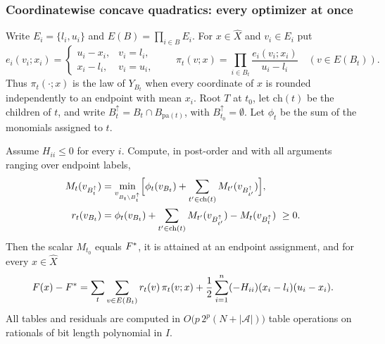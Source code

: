 \subsubsection{Coordinatewise concave quadratics: every optimizer at once}

Write $E_i=\{l_i,u_i\}$ and $E(B)=\prod_{i\in B}E_i$. For $x\in\hat X$ and
$v_i\in E_i$ put
\[
e_i(v_i;x_i)=\begin{cases}u_i-x_i,&v_i=l_i,\\ x_i-l_i,&v_i=u_i,\end{cases}
\qquad
\pi_t(v;x)=\prod_{i\in B_t}\frac{e_i(v_i;x_i)}{u_i-l_i}\quad(v\in E(B_t)).
\]
Thus $\pi_t(\cdot;x)$ is the law of $Y_{B_t}$ when every coordinate of $x$
is rounded independently to an endpoint with mean $x_i$. Root $T$ at $t_0$,
let $\mathrm{ch}(t)$ be the children of $t$, and write
$B_t^{\uparrow}=B_t\cap B_{\mathrm{pa}(t)}$, with $B_{t_0}^{\uparrow}=\emptyset$.
Let $\phi_t$ be the sum of the monomials assigned to $t$.

\begin{lemma}\label{lem:endpointid}
Assume $H_{ii}\le0$ for every $i$. Compute, in post-order and with all
arguments ranging over endpoint labels,
\begin{align*}
M_t(v_{B_t^\uparrow})&=\min_{v_{B_t\setminus B_t^\uparrow}}
\Bigl[\phi_t(v_{B_t})+\sum_{t'\in\mathrm{ch}(t)}M_{t'}(v_{B_{t'}^\uparrow})\Bigr],\\
r_t(v_{B_t})&=\phi_t(v_{B_t})+\sum_{t'\in\mathrm{ch}(t)}M_{t'}(v_{B_{t'}^\uparrow})
-M_t(v_{B_t^\uparrow})\ \ge0 .
\end{align*}
Then the scalar $M_{t_0}$ equals $F^*$, it is attained at an endpoint
assignment, and for every $x\in\hat X$
\begin{equation}\label{eq:endpointid}
F(x)-F^*=\sum_{t}\sum_{v\in E(B_t)}r_t(v)\,\pi_t(v;x)
+\frac12\sum_{i=1}^n(-H_{ii})(x_i-l_i)(u_i-x_i).
\end{equation}
All tables and residuals are computed in
$O\bigl(p\,2^p(N+|\mathcal A|)\bigr)$ table operations on rationals of
bit length polynomial in $I$.
\end{lemma}


